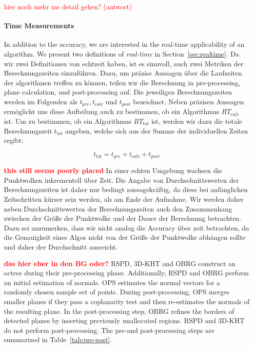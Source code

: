 \documentclass[main.tex]{subfiles}
\begin{document}
\textcolor{red}{hier noch mehr ins detail gehen? (antwort) \underline{\hspace{2cm}}}

\paragraph{Time Measurements}
\label{par:time}
In addition to the accuracy, we are interested in the real-time applicability of an algorithm. We present two definitions
of \textit{real-time} in Section~\ref{sec:realtime}.
Da wir zwei Definitionen von echtzeit haben, ist es sinnvoll, auch zwei Metriken der Berechnungszeiten einzuführen.
Dazu, um präzise Aussagen über die Laufzeiten der algorithmen treffen zu können, teilen wir die Berechnung in
pre-processing, plane calculation, und post-processing auf. Die jeweiligen Berechnungszeiten werden im Folgenden als
$t_{pre}, t_{calc}$ und $t_{post}$ bezeichnet. Neben präzisen Aussagen ermöglicht uns diese Aufteilung auch zu bestimmen,
ob ein Algorithmus $RT_{calc}$ ist. Um zu bestimmen, ob ein Algorithmus $RT_{tot}$ ist, werden wir dazu die totale
Berechnungszeit $t_{tot}$ angeben, welche sich aus der Summe der individuellen Zeiten ergibt:

\begin{equation}
    t_{tot} = t_{pre} + t_{calc} + t_{post}
\end{equation}

\textbf{\textcolor{red}{this still seems poorly placed}}
In einer echten Umgebung wachsen die Punktwolken inkrementell über Zeit.
Die Angabe von Durchschnittswerten der Berechnungszeiten ist daher nur bedingt aussagekräftig, da diese bei anfänglichen Zeitschritten
kürzer sein werden, als am Ende der Aufnahme. Wir werden daher neben Durchschnittswerten der Berechnungszeiten auch
den Zusammenhang zwischen der Größe der Punktwolke und der Dauer der Berechnung betrachten.
Dazu sei anzumerken, dass wir nicht analog die Accuracy über zeit betrachten, da die Genauigkeit eines Algos nicht
von der Größe der Punktwolke abhängen sollte und daher der Durchschnitt ausreicht.

\textbf{\textcolor{red}{das hier eher in den BG oder?}}
RSPD, 3D-KHT and OBRG construct an octree during their pre-processing phase. Additionally, RSPD and OBRG perform an initial
estimation of normals. OPS estimates the normal vectors for a randomly chosen sample set of points.
During post-processing, OPS merges smaller planes if they pass a coplanarity test and then re-estimates the normals of the
resulting plane. In the post-processing step, OBRG refines the borders of detected planes by inserting
previously unallocated regions. RSPD and 3D-KHT do not perform post-processing.
The pre-and post-processing steps are summarized in Table~\ref{tab:pre-post}.
\end{document}
